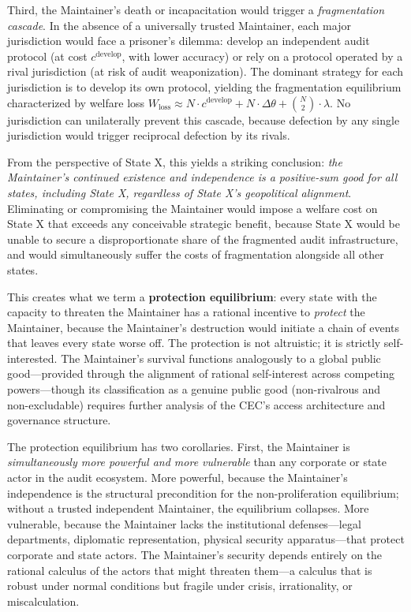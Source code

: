 \documentclass[12pt,a4paper]{ctexart}
\theoremstyle{definition}
\theoremstyle{remark}
\begin{document}
Third, the Maintainer's death or incapacitation would trigger a \textit{fragmentation cascade}. In the absence of a universally trusted Maintainer, each major jurisdiction would face a prisoner's dilemma: develop an independent audit protocol (at cost $c^{\text{develop}}$, with lower accuracy) or rely on a protocol operated by a rival jurisdiction (at risk of audit weaponization). The dominant strategy for each jurisdiction is to develop its own protocol, yielding the fragmentation equilibrium characterized by welfare loss $W_{\text{loss}} \approx N \cdot c^{\text{develop}} + N \cdot \Delta\theta + \binom{N}{2}\cdot\lambda$. No jurisdiction can unilaterally prevent this cascade, because defection by any single jurisdiction would trigger reciprocal defection by its rivals.

From the perspective of State X, this yields a striking conclusion: \textit{the Maintainer's continued existence and independence is a positive-sum good for all states, including State X, regardless of State X's geopolitical alignment}. Eliminating or compromising the Maintainer would impose a welfare cost on State X that exceeds any conceivable strategic benefit, because State X would be unable to secure a disproportionate share of the fragmented audit infrastructure, and would simultaneously suffer the costs of fragmentation alongside all other states.

This creates what we term a \textbf{protection equilibrium}: every state with the capacity to threaten the Maintainer has a rational incentive to \textit{protect} the Maintainer, because the Maintainer's destruction would initiate a chain of events that leaves every state worse off. The protection is not altruistic; it is strictly self-interested. The Maintainer's survival functions analogously to a global public good—provided through the alignment of rational self-interest across competing powers—though its classification as a genuine public good (non-rivalrous and non-excludable) requires further analysis of the CEC's access architecture and governance structure.

The protection equilibrium has two corollaries. First, the Maintainer is \textit{simultaneously more powerful and more vulnerable} than any corporate or state actor in the audit ecosystem. More powerful, because the Maintainer's independence is the structural precondition for the non-proliferation equilibrium; without a trusted independent Maintainer, the equilibrium collapses. More vulnerable, because the Maintainer lacks the institutional defenses—legal departments, diplomatic representation, physical security apparatus—that protect corporate and state actors. The Maintainer's security depends entirely on the rational calculus of the actors that might threaten them—a calculus that is robust under normal conditions but fragile under crisis, irrationality, or miscalculation.
\end{document}
